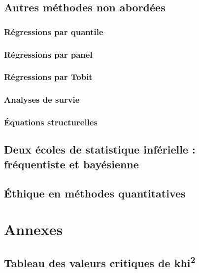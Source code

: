 \documentclass[
  11pt,
  french,
]{book}
\begin{document}
\hypertarget{sect122}{%
\section{Autres méthodes non abordées}\label{sect122}}

\hypertarget{sect1221}{%
\subsection{Régressions par quantile}\label{sect1221}}

\hypertarget{sect1222}{%
\subsection{Régressions par panel}\label{sect1222}}

\hypertarget{sect1223}{%
\subsection{Régressions par Tobit}\label{sect1223}}

\hypertarget{sect1224}{%
\subsection{Analyses de survie}\label{sect1224}}

\hypertarget{sect1225}{%
\subsection{Équations structurelles}\label{sect1225}}

\hypertarget{sect123}{%
\section{Deux écoles de statistique inférielle : fréquentiste et bayésienne}\label{sect123}}

\hypertarget{sect124}{%
\section{Éthique en méthodes quantitatives}\label{sect124}}

\hypertarget{annexes}{%
\chapter{Annexes}\label{annexes}}

\hypertarget{annexe1}{%
\section{\texorpdfstring{Tableau des valeurs critiques de khi\textsuperscript{2}}{Tableau des valeurs critiques de khi2}}\label{annexe1}}
\end{document}
